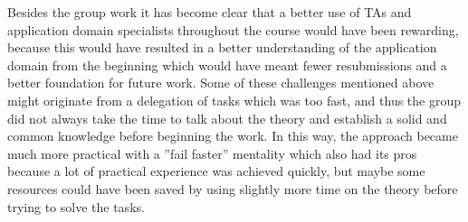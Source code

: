 Besides the group work it has become clear that a better use of TAs and application domain specialists throughout the course would have been rewarding, because this would have resulted in a better understanding of the application domain from the beginning which would have meant fewer resubmissions and a better foundation for future work. 
Some of these challenges mentioned above might originate from a delegation of tasks which was too fast, and thus the group did not always take the time to talk about the theory and establish a solid and common knowledge before beginning the work. In this way, the approach became much more practical with a ''fail faster'' mentality which also had its pros because a lot of practical experience was achieved quickly, but maybe some resources could have been saved by using slightly more time on the theory before trying to solve the tasks.

